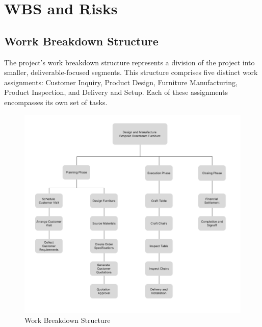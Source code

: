 \section{WBS and Risks}
\subsection{Worrk Breakdown Structure}
The project's work breakdown structure represents a division of the project into smaller, deliverable-focused segments. This structure comprises five distinct work assignments: Customer Inquiry, Product Design, Furniture Manufacturing, Product Inspection, and Delivery and Setup. Each of these assignments encompasses its own set of tasks.
\begin{figure}[!h]
    \centering
    \includegraphics[scale=0.5]{WBS.png}
    \caption{Work Breakdown Structure}
    \label{figure:wbs}
\end{figure}
\newpage
